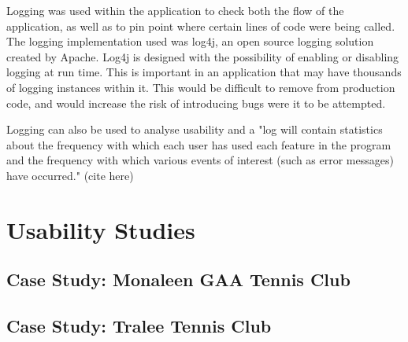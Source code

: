 Logging was used within the application to check both the flow of the application, as well as to pin point where certain lines of code were being called. The logging implementation used was log4j, an open source logging solution created by Apache. Log4j is designed with the possibility of enabling or disabling logging at run time. This is important in an application that may have thousands of logging instances within it. This would be difficult to remove from production code, and would increase the risk of introducing bugs were it to be attempted. 

Logging can also be used to analyse usability and a "log will contain statistics about the frequency with which each user has used each feature in the program and the frequency with which various events of interest (such as error messages) have occurred." (cite here)

\section{Usability Studies}

\subsection{Case Study: Monaleen GAA Tennis Club}

\subsection{Case Study: Tralee Tennis Club}